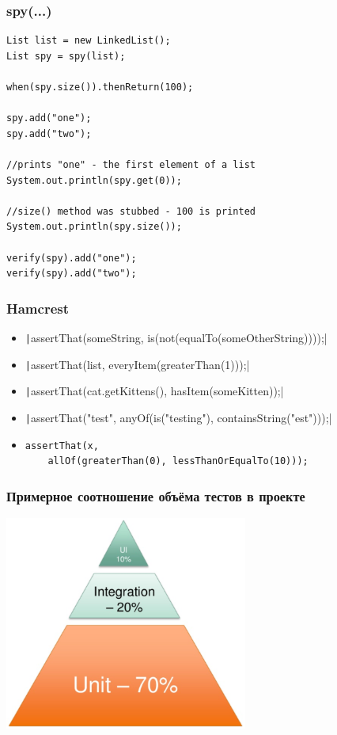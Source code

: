 \documentclass[xetex,mathserif,serif]{beamer}
\begin{document}
	\begin{frame}[fragile]
		\frametitle{spy(...)}
		\begin{small}
			\begin{verbatim}
List list = new LinkedList();
List spy = spy(list);

when(spy.size()).thenReturn(100);

spy.add("one");
spy.add("two");

//prints "one" - the first element of a list
System.out.println(spy.get(0));

//size() method was stubbed - 100 is printed
System.out.println(spy.size());

verify(spy).add("one");
verify(spy).add("two");
			\end{verbatim}
		\end{small}
	\end{frame}

	\begin{frame}[fragile]
		\frametitle{Hamcrest}
		\begin{itemize}
			\item \texttt|assertThat(someString, is(not(equalTo(someOtherString))));|
			\pause
			\item \texttt|assertThat(list, everyItem(greaterThan(1)));|
			\pause
			\item \texttt|assertThat(cat.getKittens(), hasItem(someKitten));|
			\pause
			\item \texttt|assertThat("test", anyOf(is("testing"), containsString("est")));|
			\pause
			\item 
				\begin{verbatim}
assertThat(x, 
    allOf(greaterThan(0), lessThanOrEqualTo(10)));
				\end{verbatim}
		\end{itemize}
	\end{frame}

	\begin{frame}
		\frametitle{Примерное соотношение объёма тестов в проекте}
		\begin{center}
			\includegraphics[width=0.6\textwidth]{testPyramid.png}
		\end{center}
	\end{frame}
\end{document}
